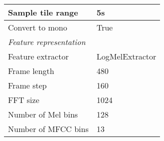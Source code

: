 \begin{table}[ht]
\begin{tabular}{l|l}
        \hline
        Sample tile range & 5s \\
        \hline
        Convert to mono & True \\
        \midrule[1pt]
        \multicolumn{2}{l}{\textit{Feature representation}} \\
        \midrule[1pt]
        Feature extractor & LogMelExtractor \\ 
        \hline
        Frame length & 480 \\
        \hline
        Frame step & 160 \\
        \hline
        FFT size & 1024 \\
        \hline
        Number of Mel bins & 128 \\
        \hline
        Number of MFCC bins & 13 \\
        \bottomrule
    \end{tabular}
\end{table}

